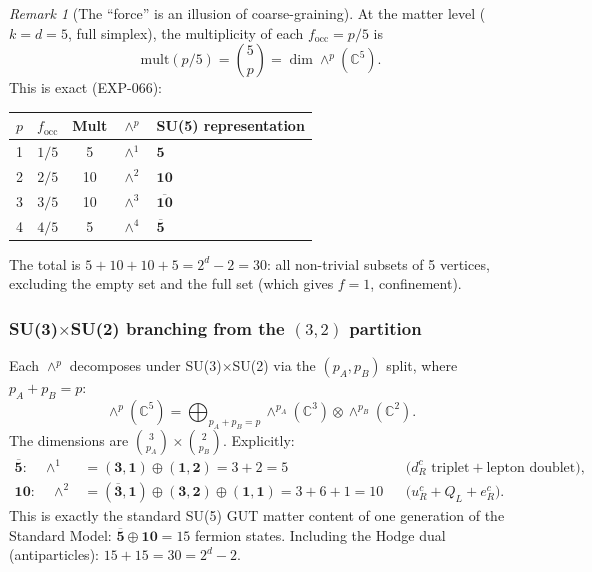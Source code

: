 \documentclass[12pt]{article}
\theoremstyle{remark}
\newtheorem{remark}[theorem]{Remark}
\theoremstyle{definition}
\newcommand{\CC}{\mathbb{C}}
\begin{document}
\begin{remark}[The ``force'' is an illusion of coarse-graining]
At the matter level ($k = d = 5$, full simplex), the multiplicity of each $f_\mathrm{occ} = p/5$ is
\begin{equation}
\mathrm{mult}(p/5) = \binom{5}{p} = \dim \wedge^p(\CC^5).
\end{equation}
This is exact (EXP-066):
\begin{center}
\begin{tabular}{ccccl}
\hline
$p$ & $f_\mathrm{occ}$ & Mult & $\wedge^p$ & SU(5) representation \\
\hline
1 & $1/5$ & 5 & $\wedge^1$ & $\mathbf{5}$ \\
2 & $2/5$ & 10 & $\wedge^2$ & $\mathbf{10}$ \\
3 & $3/5$ & 10 & $\wedge^3$ & $\overline{\mathbf{10}}$ \\
4 & $4/5$ & 5 & $\wedge^4$ & $\overline{\mathbf{5}}$ \\
\hline
\end{tabular}
\end{center}
The total is $5 + 10 + 10 + 5 = 2^d - 2 = 30$: all non-trivial subsets of 5 vertices, excluding the empty set and the full set (which gives $f = 1$, confinement).

\subsubsection{SU(3)$\times$SU(2) branching from the $(3,2)$ partition}

Each $\wedge^p$ decomposes under SU(3)$\times$SU(2) via the $(p_A, p_B)$ split, where $p_A + p_B = p$:
\begin{equation}
\wedge^p(\CC^5) = \bigoplus_{p_A + p_B = p} \wedge^{p_A}(\CC^3) \otimes \wedge^{p_B}(\CC^2).
\end{equation}
The dimensions are $\binom{3}{p_A} \times \binom{2}{p_B}$.  Explicitly:
\begin{align}
\overline{\mathbf{5}}: \quad \wedge^1 &= (\mathbf{3},\mathbf{1}) \oplus (\mathbf{1},\mathbf{2}) = 3 + 2 = 5
&&\text{(}d_R^c \text{ triplet} + \text{lepton doublet),} \\
\mathbf{10}: \quad \wedge^2 &= (\overline{\mathbf{3}},\mathbf{1}) \oplus (\mathbf{3},\mathbf{2}) \oplus (\mathbf{1},\mathbf{1}) = 3 + 6 + 1 = 10
&&\text{(}u_R^c + Q_L + e_R^c\text{).}
\end{align}
This is exactly the standard SU(5) GUT matter content of one generation of the Standard Model: $\overline{\mathbf{5}} \oplus \mathbf{10} = 15$ fermion states.  Including the Hodge dual (antiparticles): $15 + 15 = 30 = 2^d - 2$.


\end{remark}
\end{document}
